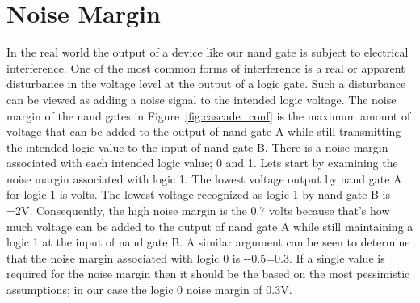     \section{Noise Margin}
        In the real world the output of a device like our nand gate is subject
        to electrical interference.  One of the most common forms of interference
        is a real or apparent disturbance in the voltage level at the output of a
        logic gate.  Such a disturbance can be viewed as adding a noise signal to
        the intended logic voltage.  The noise margin of the nand gates in
        Figure~\ref{fig:cascade_conf} is the maximum amount of voltage that can
        be added to the output of nand gate A while still transmitting the
        intended logic value to the input of nand gate B.  There is a noise
        margin associated with each intended logic value; 0 and 1.  Lets
        start by examining the noise margin associated with logic
        1.  The lowest voltage output by nand gate A for logic 1 is 
        volts.  The lowest voltage recognized as logic 1 by
        nand gate B is \VIH=2V.  Consequently, the high noise margin is the 0.7
        volts because that's how much voltage can be added to the output of
        nand gate A while still maintaining a logic 1 at the input of nand gate
        B. A similar argument can be seen to determine that the noise
        margin associated with logic 0 is \VIL--0.5=0.3.  If a
        single value is required for the noise margin then it should be
        the based on the most pessimistic assumptions; in our case the
        logic 0 noise margin of 0.3V.

